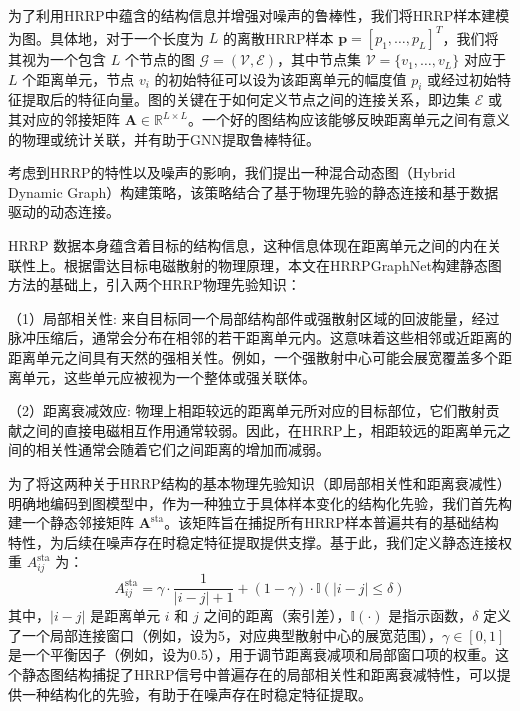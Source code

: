 为了利用HRRP中蕴含的结构信息并增强对噪声的鲁棒性，我们将HRRP样本建模为图。具体地，对于一个长度为 $L$ 的离散HRRP样本 $\mathbf{p} = [p_1, \dots, p_L]^T$，我们将其视为一个包含 $L$ 个节点的图 $\mathcal{G} = (\mathcal{V}, \mathcal{E})$，其中节点集 $\mathcal{V} = \{v_1, \dots, v_L\}$ 对应于 $L$ 个距离单元，节点 $v_i$ 的初始特征可以设为该距离单元的幅度值 $p_i$ 或经过初始特征提取后的特征向量。图的关键在于如何定义节点之间的连接关系，即边集 $\mathcal{E}$ 或其对应的邻接矩阵 $\mathbf{A} \in \mathbb{R}^{L \times L}$。一个好的图结构应该能够反映距离单元之间有意义的物理或统计关联，并有助于GNN提取鲁棒特征。

考虑到HRRP的特性以及噪声的影响，我们提出一种混合动态图（Hybrid Dynamic Graph）构建策略，该策略结合了基于物理先验的静态连接和基于数据驱动的动态连接。

HRRP 数据本身蕴含着目标的结构信息，这种信息体现在距离单元之间的内在关联性上。根据雷达目标电磁散射的物理原理，本文在HRRPGraphNet构建静态图方法的基础上，引入两个HRRP物理先验知识：

（1）局部相关性: 来自目标同一个局部结构部件或强散射区域的回波能量，经过脉冲压缩后，通常会分布在相邻的若干距离单元内。这意味着这些相邻或近距离的距离单元之间具有天然的强相关性。例如，一个强散射中心可能会展宽覆盖多个距离单元，这些单元应被视为一个整体或强关联体。

（2）距离衰减效应: 物理上相距较远的距离单元所对应的目标部位，它们散射贡献之间的直接电磁相互作用通常较弱。因此，在HRRP上，相距较远的距离单元之间的相关性通常会随着它们之间距离的增加而减弱。

为了将这两种关于HRRP结构的基本物理先验知识（即局部相关性和距离衰减性）明确地编码到图模型中，作为一种独立于具体样本变化的结构化先验，我们首先构建一个静态邻接矩阵 $\mathbf{A}^{\text{sta}}$。该矩阵旨在捕捉所有HRRP样本普遍共有的基础结构特性，为后续在噪声存在时稳定特征提取提供支撑。基于此，我们定义静态连接权重 $A^{\text{sta}}_{ij}$ 为：
\begin{equation}
    A^{\text{sta}}_{ij} = \gamma \cdot \frac{1}{|i-j|+1} + (1-\gamma) \cdot \mathbb{I}(|i-j| \leq \delta)
    \label{eq:static_adjacency}
\end{equation}
其中，$|i-j|$ 是距离单元 $i$ 和 $j$ 之间的距离（索引差），$\mathbb{I}(\cdot)$ 是指示函数，$\delta$ 定义了一个局部连接窗口（例如，设为5，对应典型散射中心的展宽范围），$\gamma \in [0,1]$ 是一个平衡因子（例如，设为0.5），用于调节距离衰减项和局部窗口项的权重。这个静态图结构捕捉了HRRP信号中普遍存在的局部相关性和距离衰减特性，可以提供一种结构化的先验，有助于在噪声存在时稳定特征提取。

